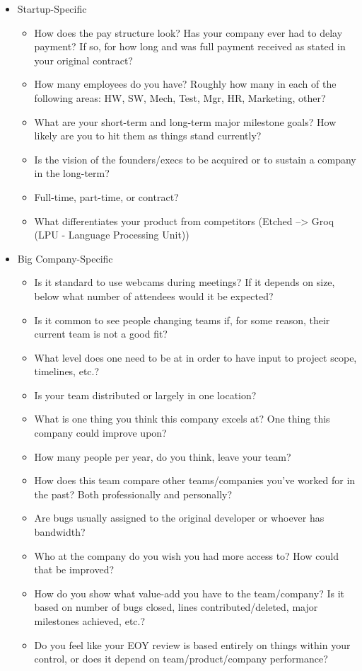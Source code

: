 \documentclass{article}
\begin{document}
\begin{itemize}
\begin{itemize}
	      \end{itemize}
	\item Startup-Specific
	      \begin{itemize}
		      \item How does the pay structure look? Has your company ever had to delay payment? If so, for how long and was full payment received as stated in your original contract?
		      \item How many employees do you have? Roughly how many in each of the following areas: HW, SW, Mech, Test, Mgr, HR, Marketing, other?
		      \item What are your short-term and long-term major milestone goals? How likely are you to hit them as things stand currently?
		      \item Is the vision of the founders/execs to be acquired or to sustain a company in the long-term?
		      \item Full-time, part-time, or contract?
		      \item What differentiates your product from competitors (Etched --> Groq (LPU - Language Processing Unit))
	      \end{itemize}
	\item Big Company-Specific
	      \begin{itemize}
		      \item Is it standard to use webcams during meetings? If it depends on size, below what number of attendees would it be expected?
		      \item Is it common to see people changing teams if, for some reason, their current team is not a good fit?
		      \item What level does one need to be at in order to have input to project scope, timelines, etc.?
		      \item Is your team distributed or largely in one location?
		      \item What is one thing you think this company excels at? One thing this company could improve upon?
		      \item How many people per year, do you think, leave your team?
		      \item How does this team compare other teams/companies you've worked for in the past? Both professionally and personally?
		      \item Are bugs usually assigned to the original developer or whoever has bandwidth?
		      \item Who at the company do you wish you had more access to? How could that be improved?
		      \item How do you show what value-add you have to the team/company? Is it based on number of bugs closed, lines contributed/deleted, major milestones achieved, etc.?
		      \item Do you feel like your EOY review is based entirely on things within your control, or does it depend on team/product/company performance?
	      \end{itemize}
\end{itemize}
\end{document}
